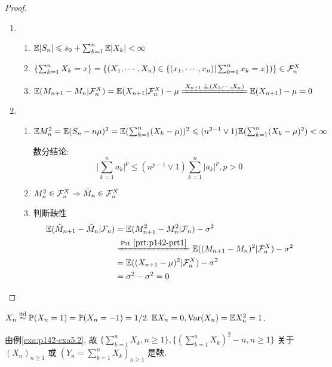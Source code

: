 \begin{proof}
    \begin{enumerate}
        \item \begin{enumerate}
            \item $\mathbb E|S_n|\leqslant s_0+\sum_{k=1}^n \mathbb E|X_k|<\infty$
            \item $\{\sum_{k=1}^n X_k=x\}=\{(X_1,\cdots,X_n)\in \{(x_1,\cdots,x_n)|\sum_{k=1}^n x_k=x\})\}\in \mathcal{F}_n^X$
            \item $\EE(M_{n+1}-M_n|\CF_n^X)=\EE(X_{n+1}|\CF_n^X)-\mu\xlongequal{X_{n+1}\ind (X_1,\cdots,X_n)}\EE(X_{n+1})-\mu=0$
        \end{enumerate}
        \item \begin{enumerate}
            \item $\mathbb E M_n^2=\mathbb E(S_n-n\mu)^2=\mathbb E(\sum_{k=1}^n (X_k-\mu))^2\leqslant (n^{2-1}\lor 1)\mathbb E(\sum_{k=1}^n(X_k-\mu)^2)<\infty$
            
            数分结论:
            \[
            \boxed{
                \bigg|
                    \sum_{k=1}^n a_k
                \bigg|^p\leq
                (n^{p-1}\lor 1)\sum_{k=1}^n |a_k|^p, p>0
            }
            \]
            \item $M_n^2\in\mathcal{F}_n^X\Rightarrow \tilde{M}_n\in\mathcal{F}_n^X$
            \item 判断鞅性
            \[
            \begin{aligned}
                \EE(\tilde{M}_{n+1}-\tilde{M}_n|\CF_n) &=\EE(M_{n+1}^2-M_n^2|\CF_n)-\sigma^2\\
                &\xlongequal{\text{Prt}\ \ref{prt:p142-prt1}} \EE((M_{n+1}-M_n)^2|\CF_n^X)-\sigma^2\\
                &=\EE((X_{n+1}-\mu)^2|\CF_n^X)-\sigma^2\\
                &=\sigma^2-\sigma^2=0
            \end{aligned}
            \]
        \end{enumerate}
    \end{enumerate}
\end{proof}

\begin{example}[简单对称随机游走]
    $X_n\overset{\text{iid}}{\sim} \mathbb{P}(X_n=1)=\mathbb{P}(X_n=-1)=1/2.\ \mathbb E X_n=0, \operatorname{Var}(X_n)=\mathbb E X_n^2=1$.
\end{example}

由例\ref{exa:p142-exa5.2}, 故 $\{\sum_{k=1}^n X_k,n\geq 1\}, \{(\sum_{k=1}^n X_k)^2-n,n\geq 1\}$ 关于 $(X_n)_{n\geq 1}$ 或 $(Y_n=\sum_{k=1}^n X_k)_{n\geq 1}$ 是鞅.

